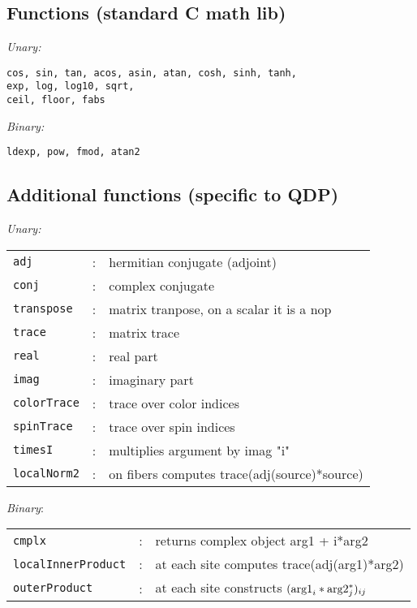 \documentclass[12pt,letterpaper]{article}
\begin{document}
\medskip


\subsection{Functions (standard C math lib)}
\label{sec:cfuncs}

\noindent
{\em Unary:}

\begin{verbatim}
cos, sin, tan, acos, asin, atan, cosh, sinh, tanh,
exp, log, log10, sqrt,
ceil, floor, fabs
\end{verbatim}

\noindent
{\em Binary:}

\begin{verbatim}
ldexp, pow, fmod, atan2
\end{verbatim}

\medskip


\subsection{Additional functions (specific to QDP)}
\label{sec:funcs}

\noindent
{\em Unary:}

\begin{flushleft}
\begin{tabular}{lcp{4.0in}}
\verb|adj|              &:& hermitian conjugate (adjoint)\\
\verb|conj|             &:& complex conjugate\\
\verb|transpose|        &:& matrix tranpose, on a scalar it is a nop\\
\verb|trace|            &:& matrix trace\\
\verb|real|             &:& real part\\
\verb|imag|             &:& imaginary part\\
\verb|colorTrace|       &:& trace over color indices\\
\verb|spinTrace|        &:& trace over spin indices\\
\verb|timesI|           &:& multiplies argument by imag "i"\\
\verb|localNorm2|       &:& on fibers computes trace(adj(source)*source)\\
\end{tabular}
\end{flushleft}

\noindent
{\em Binary}:

\begin{flushleft}
\begin{tabular}{lcp{4.0in}}
\verb|cmplx|              &:& returns complex object   arg1 + i*arg2\\
\verb|localInnerProduct|  &:& at each site computes trace(adj(arg1)*arg2)\\
\verb|outerProduct|       &:& at each site constructs $({\rm arg1}_i * {\rm arg2}_j^*)_{ij}$\\
\end{tabular}
\end{flushleft}
\end{document}
